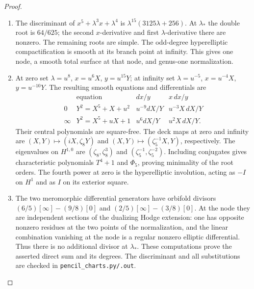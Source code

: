 \documentclass[11pt,a4paper]{article}
\theoremstyle{definition}
\begin{document}
\begin{proof}
\begin{enumerate}[label=\arabic*.]
\item The discriminant of $x^5+\lambda^3x+\lambda^4$ is
$\lambda^{15}(3125\lambda+256)$.
At $\lambda_*$ the double root is $64/625$;
the second $x$-derivative and first $\lambda$-derivative there are
nonzero.  The remaining roots are simple.  The odd-degree
hyperelliptic compactification is smooth at its branch point at
infinity.  This gives one node, a smooth total surface at that node,
and genus-one normalization.

\item At zero set $\lambda=u^8$, $x=u^6X$, $y=u^{15}Y$; at infinity set
$\lambda=u^{-5}$, $x=u^{-4}X$, $y=u^{-10}Y$.
The resulting smooth equations and differentials are
\[
\begin{array}{c|c|c|c}
 &\text{equation}&dx/y&x\,dx/y\\\hline
0&Y^2=X^5+X+u^2&u^{-9}dX/Y&u^{-3}X\,dX/Y\\
\infty&Y^2=X^5+uX+1&u^6dX/Y&u^2X\,dX/Y.
\end{array}
\]
Their central polynomials are square-free.  The deck maps at zero and
infinity are $(X,Y)\mapsto(iX,\zeta_8Y)$ and
$(X,Y)\mapsto(\zeta_5^{-1}X,Y)$, respectively.
The eigenvalues on $H^{1,0}$ are $(\zeta_8,\zeta_8^3)$ and
$(\zeta_5^{-1},\zeta_5^{-2})$.  Including conjugates gives characteristic
polynomials $T^4+1$ and $\Phi_5$, proving minimality of the root orders.
The fourth power at zero is the hyperelliptic involution, acting as
$-I$ on $H^1$ and as $I$ on its exterior square.

\item The two meromorphic differential generators have orbifold divisors
$(6/5)[\infty]-(9/8)[0]$ and
$(2/5)[\infty]-(3/8)[0]$.
At the node they are independent sections of the dualizing Hodge
extension: one has opposite nonzero residues at the two points of the
normalization, and the linear combination vanishing at the node is a
regular nonzero elliptic differential.  Thus there is no additional
divisor at $\lambda_*$.  These computations prove the asserted direct
sum and its degrees.  The discriminant and all substitutions are
checked in \texttt{pencil\_charts.py/.out}.

\end{enumerate}
\end{proof}
\end{document}
